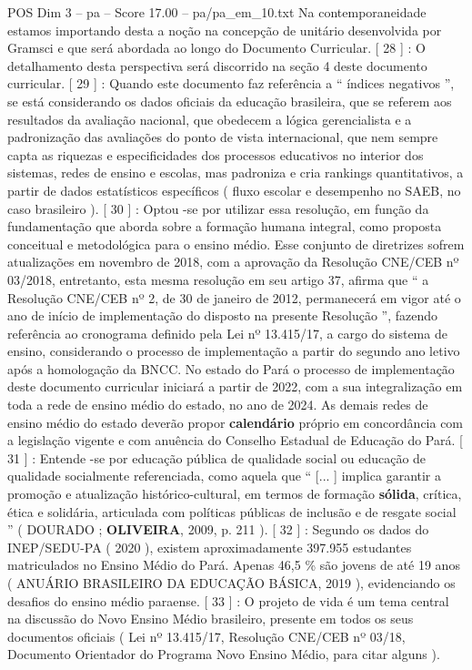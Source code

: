 \begin{textsample}{POS Dim 3 – pa – Score 17.00 – pa/pa\_em\_10.txt}
Na contemporaneidade estamos importando desta a noção na concepção de unitário desenvolvida por Gramsci e que será abordada ao longo do Documento Curricular. [ 28 ] : O detalhamento desta perspectiva será discorrido na seção 4 deste documento curricular. [ 29 ] : Quando este documento faz referência a “ índices negativos ”, se está considerando os dados oficiais da educação brasileira, que se referem aos resultados da avaliação nacional, que obedecem a lógica gerencialista e a padronização das avaliações do ponto de vista internacional, que nem sempre capta as riquezas e especificidades dos processos educativos no interior dos sistemas, redes de ensino e escolas, mas padroniza e cria rankings quantitativos, a partir de dados estatísticos específicos ( fluxo escolar e desempenho no SAEB, no caso brasileiro ). [ 30 ] : Optou -se por utilizar essa resolução, em função da fundamentação que aborda sobre a formação humana integral, como proposta conceitual e metodológica para o ensino médio.
Esse conjunto de diretrizes sofrem atualizações em novembro de 2018, com a aprovação da Resolução CNE/CEB nº 03/2018, entretanto, esta mesma resolução em seu artigo 37, afirma que “ a Resolução CNE/CEB nº 2, de 30 de janeiro de 2012, permanecerá em vigor até o ano de início de implementação do disposto na presente Resolução ”, fazendo referência ao cronograma definido pela Lei nº 13.415/17, a cargo do sistema de ensino, considerando o processo de implementação a partir do segundo ano letivo após a homologação da BNCC.
No estado do Pará o processo de implementação deste documento curricular iniciará a partir de 2022, com a sua integralização em toda a rede de ensino médio do estado, no ano de 2024.
As demais redes de ensino médio do estado deverão propor \textbf{calendário} próprio em concordância com a legislação vigente e com anuência do Conselho Estadual de Educação do Pará. [ 31 ] : Entende -se por educação pública de qualidade social ou educação de qualidade socialmente referenciada, como aquela que “ [... ] implica garantir a promoção e atualização histórico-cultural, em termos de formação \textbf{sólida}, crítica, ética e solidária, articulada com políticas públicas de inclusão e de resgate social ” ( DOURADO ; \textbf{OLIVEIRA}, 2009, p. 211 ). [ 32 ] : Segundo os dados do INEP/SEDU-PA ( 2020 ), existem aproximadamente 397.955 estudantes matriculados no Ensino Médio do Pará.
Apenas 46,5 \% são jovens de até 19 anos ( ANUÁRIO BRASILEIRO DA EDUCAÇÃO BÁSICA, 2019 ), evidenciando os desafios do ensino médio paraense. [ 33 ] : O projeto de vida é um tema central na discussão do Novo Ensino Médio brasileiro, presente em todos os seus documentos oficiais ( Lei nº 13.415/17, Resolução CNE/CEB nº 03/18, Documento Orientador do Programa Novo Ensino Médio, para citar alguns ).

\end{textsample}
